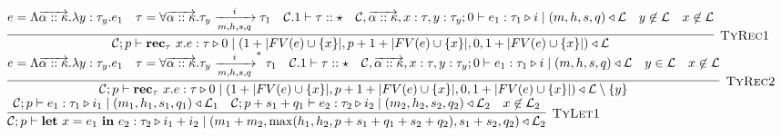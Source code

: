 \documentclass[fleqn]{article}
\begin{document}
\[\begin{array}{l}



\infer[\textsc{TyRec1}]{\jtygc{\mathcal{C};p }{ \mathbf{rec}_\tau~x. e }{ \tau }{ 0 }{1 + |FV(e) \cup \{x\}| }{ p+1+|FV(e)\cup\{x\}| }{0}{1+|FV(e)\cup\{x\}|}{\mathcal{L}} }{e = \Lambda \overrightarrow{\alpha :: \kappa}. \lambda y : \tau_y. e_1 & \tau = \forall \overrightarrow{\alpha :: \kappa}. \tau_y \xrightarrow[m,h,s,q]{i} \tau_1 & \mathcal{C}.1 \vdash \tau :: \star & \jtygc{ \mathcal{C},\overrightarrow{\alpha::\kappa},x:\tau,y:\tau_y;0 }{ e_1 }{ \tau_1 }{ i }{ m}{h}{s}{q}{\mathcal{L} } & y\not\in \mathcal{L} & x\not\in \mathcal{L} } \\

\infer[\textsc{TyRec2}]{\jtygc{\mathcal{C};p }{ \mathbf{rec}_\tau~x. e }{ \tau }{ 0 }{1 + |FV(e) \cup \{x\}| }{ p+1+|FV(e)\cup\{x\}| }{0}{1+|FV(e)\cup\{x\}|}{\mathcal{L} \setminus \{ y\}} }{e = \Lambda \overrightarrow{\alpha :: \kappa}. \lambda y : \tau_y. e_1 & \tau = \forall \overrightarrow{\alpha :: \kappa}. \tau_y \xrightarrow[m,h,s,q]{i}^* \tau_1 & \mathcal{C}.1 \vdash \tau :: \star & \jtygc{ \mathcal{C},\overrightarrow{\alpha::\kappa},x:\tau,y:\tau_y;0 }{ e_1 }{ \tau_1 }{ i }{ m}{h}{s}{q}{\mathcal{L} } & y \in \mathcal{L} & x\not\in \mathcal{L}  } \\

\infer[\textsc{TyLet1}]{\jtygc{\mathcal{C};p }{ \mathbf{let}~x=e_1~\mathbf{in}~e_2 }{ \tau_2 }{ i_1 + i_2 }{ m_1 + m_2}{\max(h_1,h_2,p+s_1+q_1+s_2+q_2)}{s_1+s_2}{q_2}{\mathcal{L}_2} }{\jtygc{\mathcal{C};p }{ e_1 }{ \tau_1 }{ i_1 }{ m_1 }{h_1}{s_1}{q_1}{\mathcal{L}_1} & \jtygc{\mathcal{C};p+s_1+q_1 }{ e_2 }{ \tau_2 }{ i_2 }{ m_2}{h_2}{s_2}{q_2}{\mathcal{L}_2} & x \not\in \mathcal{L}_2 } \\


\end{array}\]
\end{document}
